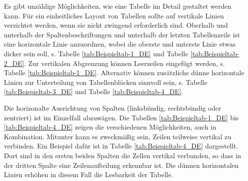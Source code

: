 Es gibt unzählige Möglichkeiten, wie eine Tabelle im Detail gestaltet werden kann. Für ein einheitliches Layout von Tabellen sollte auf vertikale Linien verzichtet werden, wenn sie nicht zwingend erforderlich sind. Oberhalb und unterhalb der Spaltenbeschriftungen und unterhalb der letzten Tabellenzeile ist eine horizontale Linie anzuordnen, wobei die oberste und unterste Linie etwas dicker sein soll, s. Tabelle \ref{tab:Beispieltab-1_DE} und Tabelle \ref{tab:Beispieltab-2_DE}. Zur vertikalen Abgrenzung können Leerzeilen eingefügt werden, s. Tabelle \ref{tab:Beispieltab-1_DE}. Alternativ können zusätzliche dünne horizontale Linien zur Unterteilung von Tabellenblöcken sinnvoll sein, s. Tabelle \ref{tab:Beispieltab-3_DE} und Tabelle \ref{tab:Beispieltab-4_DE}.

Die horizonalte Ausrichtung von Spalten (linksbündig, rechtsbündig oder zentriert) ist im Einzelfall abzuwägen. Die Tabellen \ref{tab:Beispieltab-1_DE} bis \ref{tab:Beispieltab-4_DE} zeigen die verschiedenen Möglichkeiten, auch in Kombination. Mitunter kann es zweckmäßig sein, Zeilen teilweise vertikal zu verbinden. Ein Beispiel dafür ist in Tabelle \ref{tab:Beispieltab-4_DE} dargestellt. Dort sind in den ersten beiden Spalten die Zellen vertikal verbunden, so dass in der dritten Spalte eine Zeilenaufteilung erkennbar ist. Die dünnen horizontalen Linien erhöhen in diesem Fall die Lesbarkeit der Tabelle.

